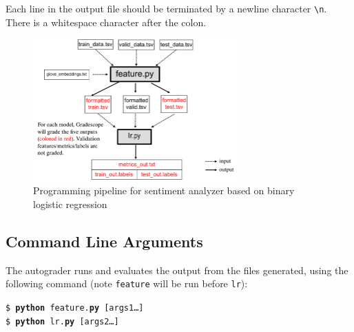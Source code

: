 \documentclass[11pt,addpoints,answers]{exam}
\begin{document}
Each line in the output file should be terminated by a newline character \lstinline{\n}. There is a whitespace character after the colon.

\begin{figure}[H]
        \centering
        \includegraphics[width = 0.7\textwidth]{fig/Pipeline_v5.png}
        \caption{Programming pipeline for sentiment analyzer based on binary logistic regression}
        \label{pipeline}
\end{figure}

\subsection{Command Line Arguments}\label{commandline}
The autograder runs and evaluates the output from the files generated, using the following command (note \lstinline{feature} will be run before \lstinline{lr}):

\begin{tabbing}
\=\texttt{\$ \textbf{python} feature.\textbf{py} [args1\dots]}\\
\>\texttt{\$ \textbf{python} lr.\textbf{py} [args2\dots]}
\end{tabbing}
\end{document}

